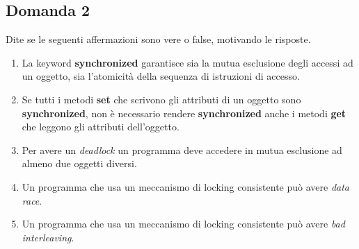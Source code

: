 \subsection{Domanda 2}
Dite se le seguenti affermazioni sono vere o false, motivando le risposte.
\begin{enumerate}
	\item La keyword \textbf{synchronized} garantisce sia la mutua esclusione degli accessi ad un oggetto, sia l'atomicità della sequenza di istruzioni di accesso.
	\item Se tutti i metodi \textbf{set} che scrivono gli attributi di un oggetto sono \textbf{synchronized}, non è necessario rendere \textbf{synchronized} anche i metodi \textbf{get} che leggono gli attributi dell'oggetto.
	\item Per avere un \textit{deadlock} un programma deve accedere in mutua esclusione ad almeno due oggetti diversi.
	\item Un programma che usa un meccanismo di locking consistente può avere \textit{data race}.
	\item Un programma che usa un meccanismo di locking consistente può avere \textit{bad interleaving}.
\end{enumerate}

\newpage

